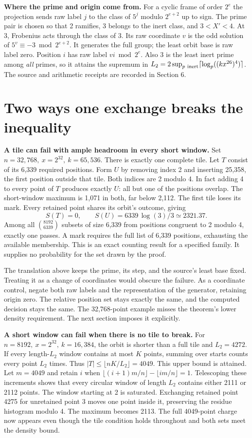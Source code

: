 \documentclass[11pt,letterpaper]{article}
\newcommand{\pp}[1]{\par\medskip\noindent\textbf{#1}\enspace}
\newcommand{\nextsection}[1]{\clearpage\section{#1}}
\begin{document}
\pp{Where the prime and origin come from.} For a cyclic frame of order \(2^e\) the projection sends raw label \(j\) to the class of \(5^j\) modulo \(2^{e+2}\) up to sign. The prime pair is chosen so that 2 ramifies, 3 belongs to the inert class, and \(3<X'<4\). At 3, Frobenius acts through the class of 3. Its raw coordinate \(v\) is the odd solution of \(5^v\equiv-3\bmod 2^{e+2}\). It generates the full group; the least orbit base is raw label zero. Position \(i\) has raw label \(vi\bmod 2^e\). Also 3 is the least inert prime among \emph{all} primes, so it attains the supremum in \(L_2=2\sup_{p\ {\rm inert}}\lceil\log_p((kx^{26})^4)\rceil\). The source and arithmetic receipts are recorded in Section 6.

\nextsection{Two ways one exchange breaks the inequality}
\pp{A tile can fail with ample headroom in every short window.}
Set \(n=32{,}768,\ x=2^{32},\ k=65{,}536\). There is exactly one complete tile. Let \(T\) consist of its 6,339 required positions. Form \(U\) by removing index 2 and inserting 25,358, the first position outside that tile. Both indices are 2 modulo 4. In fact adding 4 to every point of \(T\) produces exactly \(U\): all but one of the positions overlap. The short-window maximum is 1,071 in both, far below 2,112. The first tile loses its mark. Every retained point shares its orbit's outcome, giving
\[
 S(T)=0,\qquad S(U)=6339\,\log(3)/3 \simeq 2321.37 .
\]
Among all \(\binom{8192}{6339}\) subsets of size 6,339 from positions congruent to 2 modulo 4, exactly one passes. A mark requires the full list of 6,339 positions, exhausting the available membership. This is an exact counting result for a specified family. It supplies no probability for the set drawn by the proof.

The translation above keeps the prime, its step, and the source's least base fixed. Treating it as a change of coordinates would obscure the failure. As a coordinate control, negate both raw labels and the representation of the generator, retaining origin zero. The relative position set stays exactly the same, and the computed decision stays the same. The 32,768-point example misses the theorem's lower density requirement. The next section imposes it explicitly.

\pp{A short window can fail when there is no tile to break.}
For \(n=8192,\ x=2^{32},\ k=16{,}384\), the orbit is shorter than a full tile and \(L_2=4272\). If every length-\(L_2\) window contains at most \(K\) points, summing over starts counts every point \(L_2\) times. Thus \(|T|\le\lfloor nK/L_2\rfloor=4049\). This upper bound is attained. Let \(m=4049\) and retain \(i\) when \(\lfloor(i+1)m/n\rfloor-\lfloor im/n\rfloor=1\). Telescoping these increments shows that every circular window of length \(L_2\) contains either 2111 or 2112 points. The window starting at 2 is saturated. Exchanging retained point 4275 for unretained point 3 moves one point inside it, preserving the residue histogram modulo 4. The maximum becomes 2113. The full 4049-point charge now appears even though the tile condition holds throughout and both sets meet the density bound.
\end{document}

